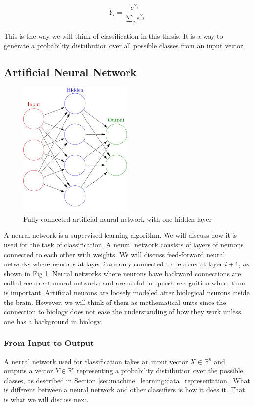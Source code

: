 \documentclass{kththesis}
\begin{document}
\begin{equation}
\label{eq:softmax}
Y_i=\frac{e^{Y_i}}{\sum_j{e^{Y_j}}}
\end{equation}

This is the way we will think of classification in this thesis. It is a way to generate a probability distribution over all possible classes from an input vector.

\subsection{Artificial Neural Network}
\begin{figure}
\centering
\includegraphics[width=0.5\textwidth]{images/ann.png}
\caption{Fully-connected artificial neural network with one hidden layer}
\label{fig:ann}
\end{figure}

A neural network is a supervised learning algorithm. We will discuss how it is used for the task of classification. A neural network consists of layers  of neurons connected to each other with weights. We will discuss feed-forward neural networks where neurons at layer $i$ are only connected to neurons at layer $i+1$, as shown in Fig \ref{fig:ann}. Neural networks where neurons have backward connections are called recurrent neural networks and are useful in speech recognition where time is important.  Artificial neurons are loosely modeled after biological  neurons inside the brain. However, we will  think of them as mathematical units since the connection to biology does not ease the understanding of  how they work unless one has a background in biology.

\subsubsection{From Input to Output}
A neural network used for classification takes an input vector $X \in \mathbb{R}^{n}$ and outputs a vector $Y \in \mathbb{R}^{c}$ representing a probability distribution over the possible classes, as described in Section \ref{sec:machine_learning:data_representation}. What is different between a neural network and other classifiers is how it does it. That is what we will discuss next. 
\end{document}
